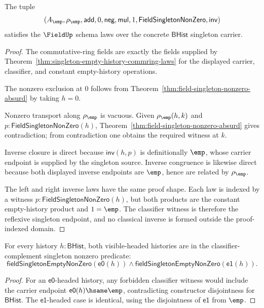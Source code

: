 \begin{theorem}
\label{thm:singleton-empty-history-field-schema-laws}
The tuple
$$
(A_{\emp},\rho_{\emp},\mathsf{add},0,\mathsf{neg},\mathsf{mul},1,
\mathsf{FieldSingletonNonZero},\mathsf{inv})
$$
satisfies the $\FieldUp$ schema laws over the concrete $\mathsf{BHist}$
singleton carrier.
\end{theorem}
\begin{proof}
The commutative-ring fields are exactly the fields supplied by
Theorem~\ref{thm:singleton-empty-history-commring-laws} for the displayed
carrier, classifier, and constant empty-history operations.

The nonzero exclusion at $0$ follows from
Theorem~\ref{thm:field-singleton-nonzero-absurd} by taking
$h=0$.

Nonzero transport along $\rho_{\emp}$ is vacuous. Given
$\rho_{\emp}(h,k)$ and $p:\mathsf{FieldSingletonNonZero}(h)$,
Theorem~\ref{thm:field-singleton-nonzero-absurd} gives
contradiction; from contradiction one obtains the required witness at $k$.

Inverse closure is direct because $\mathsf{inv}(h,p)$ is definitionally
$\emp$, whose carrier endpoint is supplied by the singleton source. Inverse
congruence is likewise direct because both displayed inverse endpoints are
$\emp$, hence are related by $\rho_{\emp}$.

The left and right inverse laws have the same proof shape. Each law is indexed
by a witness $p:\mathsf{FieldSingletonNonZero}(h)$, but both products are the
constant empty-history product and $1=\emp$. The classifier witness is therefore
the reflexive singleton endpoint, and no classical inverse is formed outside
the proof-indexed domain.
\end{proof}

\begin{theorem}
\label{thm:singleton-empty-nonzero-visible-headed}
For every history $h:\mathsf{BHist}$, both visible-headed histories are in the
classifier-complement singleton nonzero predicate:
$$
\mathsf{fieldSingletonEmptyNonZero}(\mathsf{e0}(h))
\land
\mathsf{fieldSingletonEmptyNonZero}(\mathsf{e1}(h)).
$$
\end{theorem}
\begin{proof}
For an $\mathsf{e0}$-headed history, any forbidden classifier witness would
include the carrier endpoint
$\mathsf{e0}(h)\hsame\emp$, contradicting constructor disjointness for
$\mathsf{BHist}$. The $\mathsf{e1}$-headed case is identical, using the
disjointness of $\mathsf{e1}$ from $\emp$.
\end{proof}

